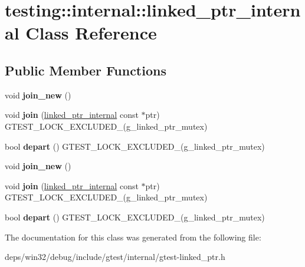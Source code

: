 \hypertarget{classtesting_1_1internal_1_1linked__ptr__internal}{}\section{testing\+:\+:internal\+:\+:linked\+\_\+ptr\+\_\+internal Class Reference}
\label{classtesting_1_1internal_1_1linked__ptr__internal}
\subsection*{Public Member Functions}
\begin{DoxyCompactItemize}
\item 
\hypertarget{classtesting_1_1internal_1_1linked__ptr__internal_a742af1f65df2d5e2b7198a1b74264a83}{}void {\bfseries join\+\_\+new} ()\label{classtesting_1_1internal_1_1linked__ptr__internal_a742af1f65df2d5e2b7198a1b74264a83}

\item 
\hypertarget{classtesting_1_1internal_1_1linked__ptr__internal_acd5a341459f7e81b10b4112d8c764e2a}{}void {\bfseries join} (\hyperlink{classtesting_1_1internal_1_1linked__ptr__internal}{linked\+\_\+ptr\+\_\+internal} const $\ast$ptr) G\+T\+E\+S\+T\+\_\+\+L\+O\+C\+K\+\_\+\+E\+X\+C\+L\+U\+D\+E\+D\+\_\+(g\+\_\+linked\+\_\+ptr\+\_\+mutex)\label{classtesting_1_1internal_1_1linked__ptr__internal_acd5a341459f7e81b10b4112d8c764e2a}

\item 
\hypertarget{classtesting_1_1internal_1_1linked__ptr__internal_a8699e539d9702d363ef0351012d1b3ca}{}bool {\bfseries depart} () G\+T\+E\+S\+T\+\_\+\+L\+O\+C\+K\+\_\+\+E\+X\+C\+L\+U\+D\+E\+D\+\_\+(g\+\_\+linked\+\_\+ptr\+\_\+mutex)\label{classtesting_1_1internal_1_1linked__ptr__internal_a8699e539d9702d363ef0351012d1b3ca}

\item 
\hypertarget{classtesting_1_1internal_1_1linked__ptr__internal_a742af1f65df2d5e2b7198a1b74264a83}{}void {\bfseries join\+\_\+new} ()\label{classtesting_1_1internal_1_1linked__ptr__internal_a742af1f65df2d5e2b7198a1b74264a83}

\item 
\hypertarget{classtesting_1_1internal_1_1linked__ptr__internal_acd5a341459f7e81b10b4112d8c764e2a}{}void {\bfseries join} (\hyperlink{classtesting_1_1internal_1_1linked__ptr__internal}{linked\+\_\+ptr\+\_\+internal} const $\ast$ptr) G\+T\+E\+S\+T\+\_\+\+L\+O\+C\+K\+\_\+\+E\+X\+C\+L\+U\+D\+E\+D\+\_\+(g\+\_\+linked\+\_\+ptr\+\_\+mutex)\label{classtesting_1_1internal_1_1linked__ptr__internal_acd5a341459f7e81b10b4112d8c764e2a}

\item 
\hypertarget{classtesting_1_1internal_1_1linked__ptr__internal_a8699e539d9702d363ef0351012d1b3ca}{}bool {\bfseries depart} () G\+T\+E\+S\+T\+\_\+\+L\+O\+C\+K\+\_\+\+E\+X\+C\+L\+U\+D\+E\+D\+\_\+(g\+\_\+linked\+\_\+ptr\+\_\+mutex)\label{classtesting_1_1internal_1_1linked__ptr__internal_a8699e539d9702d363ef0351012d1b3ca}

\end{DoxyCompactItemize}


The documentation for this class was generated from the following file\+:\begin{DoxyCompactItemize}
\item 
deps/win32/debug/include/gtest/internal/gtest-\/linked\+\_\+ptr.\+h\end{DoxyCompactItemize}
